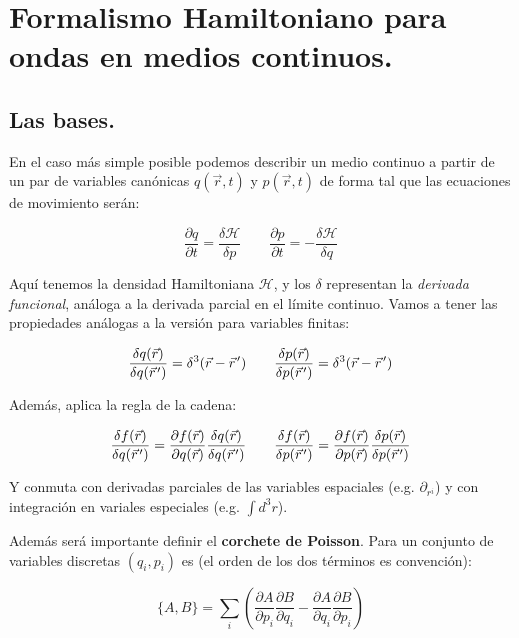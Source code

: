

\section{Formalismo Hamiltoniano para ondas en medios continuos.}
\subsection*{Las bases.}
En el caso más simple posible podemos describir un medio continuo a partir de un par de variables canónicas $q(\vec r, t)$ y $p(\vec r, t)$ de forma tal que las ecuaciones de movimiento serán:

\begin{equation}
	\frac{\partial q}{\partial t} = \frac{\delta \mathcal{H}}{\delta p} \qquad \frac{\partial p}{\partial t} = -\frac{\delta \mathcal{H}}{\delta q}
	\label{eq:Hamilton_continuum}
\end{equation}

Aquí tenemos la densidad Hamiltoniana $\mathcal{H}$, y los $\delta$ representan la \textit{derivada funcional}, análoga a la derivada parcial en el límite continuo. Vamos a tener las propiedades análogas a la versión para variables finitas:

\begin{equation}
	\frac{\delta q(\vec r)}{\delta q(\pvec r')} = \delta^3(\vec r - \pvec r') \qquad \frac{\delta p(\vec r)}{\delta p(\pvec r')} = \delta^3(\vec r - \pvec r')
\end{equation}

Además, aplica la regla de la cadena:

\begin{equation}
	\frac{\delta f(\vec r)}{\delta q(\pvec r')} = \frac{\partial f(\vec r)}{\partial q(\vec r)} \frac{\delta q(\vec r)}{\delta q(\pvec r')} \qquad \frac{\delta f(\vec r)}{\delta p(\pvec r')} = \frac{\partial f(\vec r)}{\partial p(\vec r)} \frac{\delta p(\vec r)}{\delta p(\pvec r')}
\end{equation}

Y conmuta con derivadas parciales de las variables espaciales (e.g. $\partial_{r^i}$) y con integración en variales especiales (e.g. $\int d^3r$).


Además será importante definir el \textbf{corchete de Poisson}. Para un conjunto de variables discretas $(q_i,p_i)$ es (el orden de los dos términos es convención):

\begin{equation}
	\{A, B\} = \sum_i\left(\frac{\partial A}{\partial p_i}\frac{\partial B}{\partial q_i} - \frac{\partial A}{\partial q_i}\frac{\partial B}{\partial p_i}\right)
\end{equation}

